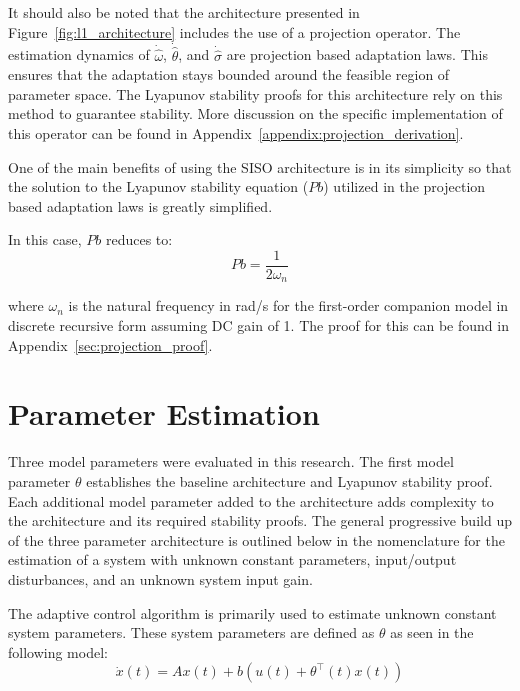 It should also be noted that the architecture presented in Figure~\ref{fig:l1_architecture} includes the use of a projection operator.  The estimation dynamics of $\dot{\hat{\omega}}$, $\dot{\hat{\theta}}$, and $\dot{\hat{\sigma}}$ are projection based adaptation laws.  This ensures that the adaptation stays bounded around the feasible region of parameter space.  The Lyapunov stability proofs for this architecture rely on this method to guarantee stability\cite{hovakimyan2010l1}.  More discussion on the specific implementation of this operator can be found in Appendix~\ref{appendix:projection_derivation}.

One of the main benefits of using the \ac{SISO} architecture is in its simplicity so that the solution to the Lyapunov stability equation ($Pb$) utilized in the projection based adaptation laws is greatly simplified.  

In this case, $Pb$ reduces to:
\begin{equation}
Pb = \frac{1}{2\omega_n}
\end{equation}

where $\omega_n$ is the natural frequency in rad/s for the first-order companion model in discrete recursive form assuming DC gain of 1.  The proof for this can be found in Appendix~\ref{sec:projection_proof}.

\section{\Lone Parameter Estimation}\label{sec:param_estimation}
Three model parameters were evaluated in this research.   The first model parameter $\theta$ establishes the baseline architecture and Lyapunov stability proof.  Each additional  model parameter added to the architecture adds complexity to the architecture and its required stability proofs.  The general progressive build up of the three parameter architecture is outlined below in the nomenclature for the estimation of a system with unknown constant parameters, input/output disturbances, and an unknown system input gain.

The \Lone adaptive control algorithm is primarily used to estimate unknown constant system parameters.  These system parameters are defined as $\theta$ as seen in the following model:
\begin{equation}
\dot{x}(t)=Ax(t)+b(u(t)+\theta^{\top}(t)x(t))
\end{equation}

